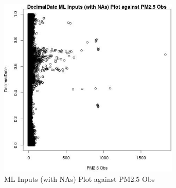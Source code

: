\begin{figure} 
\centering  
\includegraphics[width=0.77\textwidth]{Code_Outputs/Report_ML_input_PM25_Step4_part_e_de_duplicated_aveswNAs_DecimalDatevPM25_Obs.jpg} 
\caption{\label{fig:Report_ML_input_PM25_Step4_part_e_de_duplicated_aveswNAsDecimalDatevPM25_Obs}ML Inputs (with NAs) Plot against PM2.5 Obs} 
\end{figure} 
 
